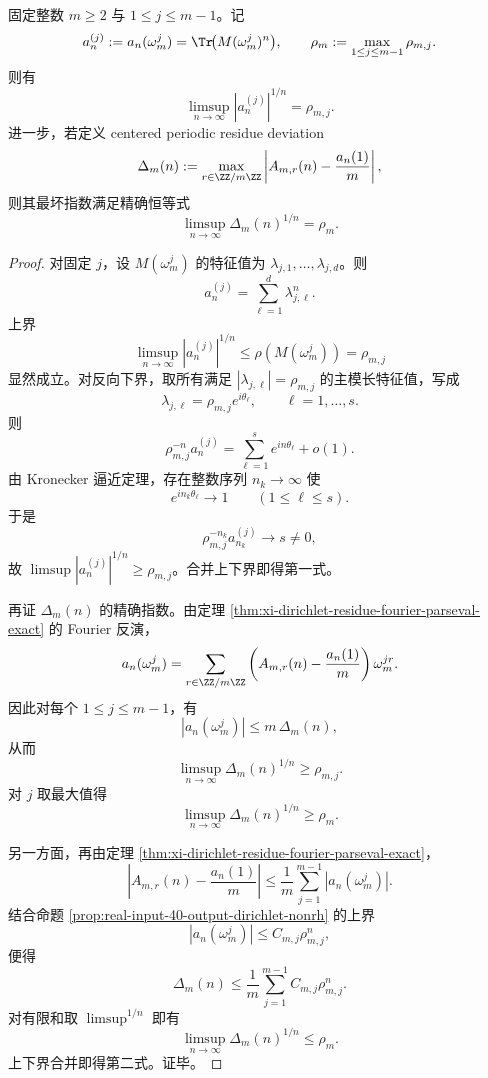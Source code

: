 \begin{theorem}\label{thm:xi-dirichlet-residue-bias-exponent-exact}
固定整数 \(m\ge 2\) 与 \(1\le j\le m-1\)。记
\[
a_n^{(j)}:=a_n(\omega_m^j)=\Tr\!\bigl(M(\omega_m^j)^n\bigr),
\qquad
\rho_m:=\max_{1\le j\le m-1}\rho_{m,j}.
\]
则有
\[
\boxed{\;
\limsup_{n\to\infty}|a_n^{(j)}|^{1/n}=\rho_{m,j}.\;}
\]
进一步，若定义 centered periodic residue deviation
\[
\Delta_m(n):=
\max_{r\in\ZZ/m\ZZ}
\left|A_{m,r}(n)-\frac{a_n(1)}{m}\right|,
\]
则其最坏指数满足精确恒等式
\[
\boxed{\;
\limsup_{n\to\infty}\Delta_m(n)^{1/n}=\rho_m.\;}
\]
\end{theorem}
\begin{proof}
对固定 \(j\)，设 \(M(\omega_m^j)\) 的特征值为 \(\lambda_{j,1},\dots,\lambda_{j,d}\)。则
\[
a_n^{(j)}=\sum_{\ell=1}^d \lambda_{j,\ell}^n.
\]
上界
\[
\limsup_{n\to\infty}|a_n^{(j)}|^{1/n}\le \rho(M(\omega_m^j))=\rho_{m,j}
\]
显然成立。对反向下界，取所有满足 \(|\lambda_{j,\ell}|=\rho_{m,j}\) 的主模长特征值，写成
\[
\lambda_{j,\ell}=\rho_{m,j}e^{i\theta_\ell},
\qquad
\ell=1,\dots,s.
\]
则
\[
\rho_{m,j}^{-n}a_n^{(j)}=\sum_{\ell=1}^{s}e^{in\theta_\ell}+o(1).
\]
由 Kronecker 逼近定理，存在整数序列 \(n_k\to\infty\) 使
\[
e^{in_k\theta_\ell}\to 1
\qquad(1\le \ell\le s).
\]
于是
\[
\rho_{m,j}^{-n_k}a_{n_k}^{(j)}\to s\neq 0,
\]
故 \(\limsup |a_n^{(j)}|^{1/n}\ge \rho_{m,j}\)。合并上下界即得第一式。

再证 \(\Delta_m(n)\) 的精确指数。由定理 \ref{thm:xi-dirichlet-residue-fourier-parseval-exact} 的 Fourier 反演，
\[
a_n(\omega_m^j)
=
\sum_{r\in\ZZ/m\ZZ}
\left(A_{m,r}(n)-\frac{a_n(1)}{m}\right)\omega_m^{jr}.
\]
因此对每个 \(1\le j\le m-1\)，有
\[
|a_n(\omega_m^j)|\le m\,\Delta_m(n),
\]
从而
\[
\limsup_{n\to\infty}\Delta_m(n)^{1/n}\ge \rho_{m,j}.
\]
对 \(j\) 取最大值得
\[
\limsup_{n\to\infty}\Delta_m(n)^{1/n}\ge \rho_m.
\]

另一方面，再由定理 \ref{thm:xi-dirichlet-residue-fourier-parseval-exact}，
\[
\left|A_{m,r}(n)-\frac{a_n(1)}{m}\right|
\le
\frac1m\sum_{j=1}^{m-1}|a_n(\omega_m^j)|.
\]
结合命题 \ref{prop:real-input-40-output-dirichlet-nonrh} 的上界
\[
|a_n(\omega_m^j)|\le C_{m,j}\rho_{m,j}^n,
\]
便得
\[
\Delta_m(n)\le \frac1m\sum_{j=1}^{m-1}C_{m,j}\rho_{m,j}^n.
\]
对有限和取 \(\limsup^{1/n}\) 即有
\[
\limsup_{n\to\infty}\Delta_m(n)^{1/n}\le \rho_m.
\]
上下界合并即得第二式。证毕。
\end{proof}

